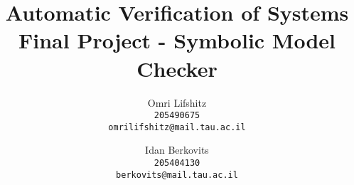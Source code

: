 \documentclass[11pt]{article}
\begin{document}
\setlength{\oddsidemargin}{.25in}
\setlength{\evensidemargin}{.25in}
\setlength{\textwidth}{6in}
\setlength{\topmargin}{-0.4in}
\setlength{\textheight}{8.5in}

\newcommand{\handout}[4]{
   \noindent
   \begin{center}
   \framebox{
      \vbox{
    \hbox to 5.78in { {\bf Automatic Verification of Systems} \hfill #1 }
       \vspace{4mm}
       \hbox to 5.78in { {\Large \hfill #4  \hfill} }
       \vspace{2mm}
       \hbox to 5.78in { {\it #2 \hfill #3} }
      }
   }
   \end{center}
   \vspace*{4mm}
}

\newcommand{\finalProjTitle}[4]{\handout{#1}{Lecturer:
#2}{Names: #3}{#4}}

\newtheorem{theorem}{Theorem}
\newtheorem{corollary}[theorem]{Corollary}
\newtheorem{lemma}[theorem]{Lemma}
\newtheorem{observation}[theorem]{Observation}
\newtheorem{proposition}[theorem]{Proposition}
\newtheorem{definition}[theorem]{Definition}
\newtheorem{claim}[theorem]{Claim}
\newtheorem{fact}[theorem]{Fact}
\newtheorem{assumption}[theorem]{Assumption}
\newtheorem{example}{Example}

\newcommand{\qed}{\rule{7pt}{7pt}}

\newenvironment{proof}{\noindent{\bf Proof:}\hspace*{1em}}{\qed\bigskip}
\newenvironment{proof-sketch}{\noindent{\bf Sketch of Proof:}\hspace*{1em}}{\qed\bigskip}
\newenvironment{proof-idea}{\noindent{\bf Proof Idea:}\hspace*{1em}}{\qed\bigskip}
\newenvironment{proof-of-lemma}[1]{\noindent{\bf Proof of Lemma #1:}\hspace*{1em}}{\qed\bigskip}
\newenvironment{proof-attempt}{\noindent{\bf Proof Attempt:}\hspace*{1em}}{\qed\bigskip}
\newenvironment{proofof}[1]{\noindent{\bf Proof}
of #1:\hspace*{1em}}{\qed\bigskip}
\newenvironment{remark}{\noindent{\bf Remark}\hspace*{1em}}{\bigskip}


\title{\vspace{-2.0cm}\textbf{Automatic Verification of Systems \\ Final Project - 
Symbolic Model Checker}}
\author{
	Omri Lifshitz \\
	\texttt{205490675} \\
	\texttt{omrilifshitz@mail.tau.ac.il}
	\and 
	Idan Berkovits \\
	\texttt{205404130} \\
	\texttt{berkovits@mail.tau.ac.il}
}
\date{}
\end{document}
